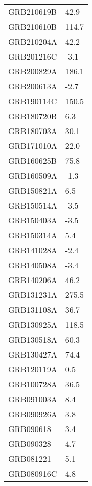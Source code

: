\begin{tabular}{ll}
\toprule
\midrule
GRB210619B & 42.9 \\
GRB210610B & 114.7 \\
GRB210204A & 42.2 \\
GRB201216C & -3.1 \\
GRB200829A & 186.1 \\
GRB200613A & -2.7 \\
GRB190114C & 150.5 \\
GRB180720B & 6.3 \\
GRB180703A & 30.1 \\
GRB171010A & 22.0 \\
GRB160625B & 75.8 \\
GRB160509A & -1.3 \\
GRB150821A & 6.5 \\
GRB150514A & -3.5 \\
GRB150403A & -3.5 \\
GRB150314A & 5.4 \\
GRB141028A & -2.4 \\
GRB140508A & -3.4 \\
GRB140206A & 46.2 \\
GRB131231A & 275.5 \\
GRB131108A & 36.7 \\
GRB130925A & 118.5 \\
GRB130518A & 60.3 \\
GRB130427A & 74.4 \\
GRB120119A & 0.5 \\
GRB100728A & 36.5 \\
GRB091003A & 8.4 \\
GRB090926A & 3.8 \\
GRB090618 & 3.4 \\
GRB090328 & 4.7 \\
GRB081221 & 5.1 \\
GRB080916C & 4.8 \\
\bottomrule
\end{tabular}
